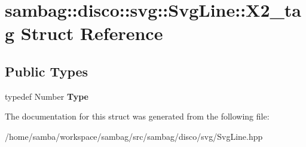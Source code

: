 \hypertarget{structsambag_1_1disco_1_1svg_1_1_svg_line_1_1_x2__tag}{
\section{sambag::disco::svg::SvgLine::X2\_\-tag Struct Reference}
\label{structsambag_1_1disco_1_1svg_1_1_svg_line_1_1_x2__tag}
}
\subsection*{Public Types}
\begin{DoxyCompactItemize}
\item 
\hypertarget{structsambag_1_1disco_1_1svg_1_1_svg_line_1_1_x2__tag_aabb682da3fb1b58a3dd98bc8561f2167}{
typedef Number {\bfseries Type}}
\label{structsambag_1_1disco_1_1svg_1_1_svg_line_1_1_x2__tag_aabb682da3fb1b58a3dd98bc8561f2167}

\end{DoxyCompactItemize}


The documentation for this struct was generated from the following file:\begin{DoxyCompactItemize}
\item 
/home/samba/workspace/sambag/src/sambag/disco/svg/SvgLine.hpp\end{DoxyCompactItemize}
